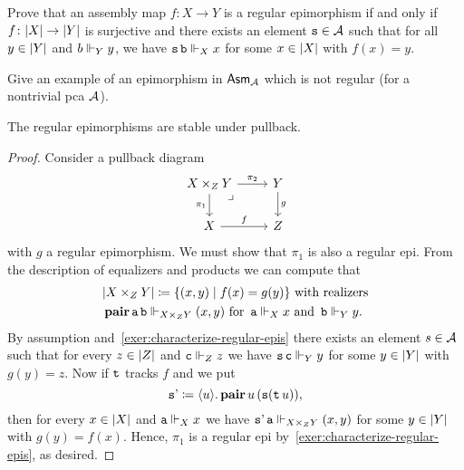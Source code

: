 \begin{exercise}%
  \label{exer:characterize-regular-epis}
  Prove that an assembly map \(f \colon X \to Y\) is a regular epimorphism if
  and only if \(f \colon \carrier{X} \to \carrier{Y}\) is surjective and there
  exists an element \(\pca{s} \in \AA\) such that for all \(y \in \carrier{Y}\)
  and \(b \realizes_Y y\), we have \(\pca{s}\pca{b} \realizes_X x\) for some
  \(x \in \carrier{X}\) with \(f(x) = y\).
\end{exercise}

\begin{exercise}\label{exer:epi-but-not-regular-epi}
  Give an example of an epimorphism in \(\Asm{\AA}\) which is not regular (for a
  nontrivial pca \(\AA\)).
\end{exercise}

\begin{proposition}
  The regular epimorphisms are stable under pullback.
\end{proposition}
\begin{proof}
  Consider a pullback diagram
  \[
    \begin{tikzcd}
      X \times_Z Y \pbcorner
      \ar[r,"\pi_2"]
      \ar[d,"\pi_1"']
      & Y \ar[d,"g"] \\
      X\ar[r,"f"] & Z
    \end{tikzcd}
  \]
  with \(g\) a regular epimorphism. We must show that \(\pi_1\) is also a
  regular epi.
  From the description of equalizers and products we can compute that
  \begin{align*}
    &\carrier{X \times_Z Y} \coloneq \set{(x,y) \mid f(x) = g(y)}
    \text{ with realizers}\\
    &\pcapair\pca{a}\pca{b} \realizes_{X \times_Z Y} (x,y)
    \text{ for }
    \pca{a} \realizes_X x
    \text{ and }
    \pca{b} \realizes_Y y.
  \end{align*}
  By assumption and~\cref{exer:characterize-regular-epis} there exists an
  element \(s \in \AA\) such that for every \(z \in \carrier{Z}\) and
  \(\pca{c} \realizes_Z z\) we have \(\pca{s}\pca{c} \realizes_Y y\) for some
  \(y \in \carrier{Y}\) with \(g(y) = z\).
  Now if \(\pca{t}\) tracks \(f\) and we put
  \[
    \pca{s'} \coloneq \lambdapca{u}{\pcapair u\,(\pca{s}(\pca{t}u))},
  \]
  then for every \(x \in \carrier{X}\) and \(\pca{a} \realizes_X x\) we have
  \(\pca{s'}\pca{a} \realizes_{X \times_Z Y} (x,y)\) for some
  \(y \in \carrier{Y}\) with \(g(y) = f(x)\).
  Hence, \(\pi_1\) is a regular epi by~\cref{exer:characterize-regular-epis}, as
  desired.
\end{proof}

